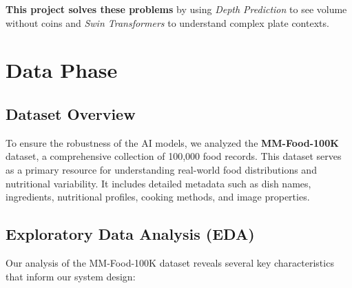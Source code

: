 \documentclass[fleqn,10pt]{SelfArx} %
\begin{document}
\textbf{This project solves these problems} by using \textit{Depth Prediction} to see volume without coins and \textit{Swin Transformers} to understand complex plate contexts.


\section{Data Phase}

\subsection{Dataset Overview}
To ensure the robustness of the AI models, we analyzed the \textbf{MM-Food-100K} dataset, a comprehensive collection of 100,000 food records. This dataset serves as a primary resource for understanding real-world food distributions and nutritional variability. It includes detailed metadata such as dish names, ingredients, nutritional profiles, cooking methods, and image properties.

\subsection{Exploratory Data Analysis (EDA)}
Our analysis of the MM-Food-100K dataset reveals several key characteristics that inform our system design:
\end{document}
